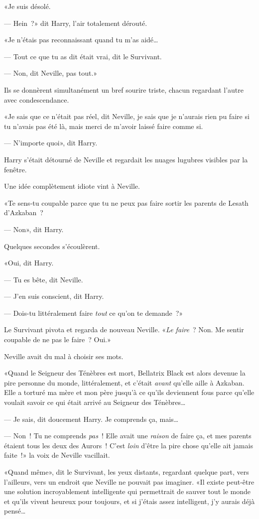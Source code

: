 «Je suis désolé.

--- Hein~?» dit Harry, l'air totalement dérouté.

«Je n'étais pas reconnaissant quand tu m'as aidé…

--- Tout ce que tu as dit était vrai, dit le Survivant.

--- Non, dit Neville, pas tout.»

Ils se donnèrent simultanément un bref sourire triste, chacun regardant l'autre avec condescendance.

«Je sais que ce n'était pas réel, dit Neville, je sais que je n'aurais rien pu faire si tu n'avais pas été là, mais merci de m'avoir laissé faire comme si.

--- N'importe quoi», dit Harry.

Harry s'était détourné de Neville et regardait les nuages lugubres visibles par la fenêtre.

Une idée complètement idiote vint à Neville.

«Te sens-tu coupable parce que tu ne peux pas faire sortir les parents de Lesath d'Azkaban~?

--- Non», dit Harry.

Quelques secondes s'écoulèrent.

«Oui, dit Harry.

--- Tu es bête, dit Neville.

--- J'en suis conscient, dit Harry.

--- Dois-tu littéralement faire \emph{tout} ce qu'on te demande~?»

Le Survivant pivota et regarda de nouveau Neville. «\emph{Le faire}~? Non. Me sentir coupable de ne pas le faire~? Oui.»

Neville avait du mal à choisir ses mots.

«Quand le Seigneur des Ténèbres est mort, Bellatrix Black est alors devenue la pire personne du monde, littéralement, et c'était \emph{avant} qu'elle aille à Azkaban. Elle a torturé ma mère et mon père jusqu'à ce qu'ils deviennent fous parce qu'elle voulait savoir ce qui était arrivé au Seigneur des Ténèbres…

--- Je sais, dit doucement Harry. Je comprends ça, mais…

--- Non~! Tu ne comprends \emph{pas}~! Elle avait une \emph{raison} de faire ça, et mes parents étaient tous les deux des Aurors~! C'est \emph{loin} d'être la pire chose qu'elle ait jamais faite~!» la voix de Neville vacillait.

«Quand même», dit le Survivant, les yeux distants, regardant quelque part, vers l'ailleurs, vers un endroit que Neville ne pouvait pas imaginer. «Il existe peut-être une solution incroyablement intelligente qui permettrait de sauver tout le monde et qu'ils vivent heureux pour toujours, et si j'étais assez intelligent, j'y aurais déjà pensé…

